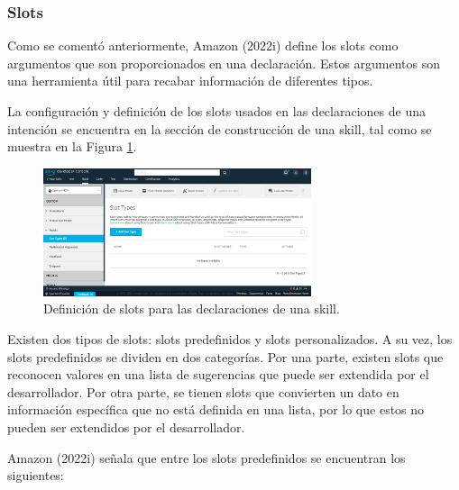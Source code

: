 
\subsubsection{Slots}
\label{SlotscapIV}

Como se comentó anteriormente, Amazon (2022i) define los slots como argumentos que son proporcionados en una declaración. Estos argumentos son una herramienta útil para recabar información de diferentes tipos.

La configuración y definición de los slots usados en las declaraciones de una intención se encuentra en la sección de construcción de una skill, tal como se muestra en la Figura \ref{fig:49}.

\begin{figure}[H]
  \centering
  \includegraphics[width=0.70\textwidth]{Cap4/Figuras/SlotTypes.png}
  \caption{Definición de slots para las declaraciones de una skill.}
  \label{fig:49}
\end{figure}

Existen dos tipos de slots: slots predefinidos y slots personalizados. A su vez, los slots predefinidos se dividen en dos categorías. Por una parte, existen slots que reconocen valores en una lista de sugerencias que puede ser extendida por el desarrollador. Por otra parte, se tienen slots que convierten un dato en información específica que no está definida en una lista, por lo que estos no pueden ser extendidos por el desarrollador.

Amazon (2022i) señala que entre los slots predefinidos se encuentran los siguientes:

